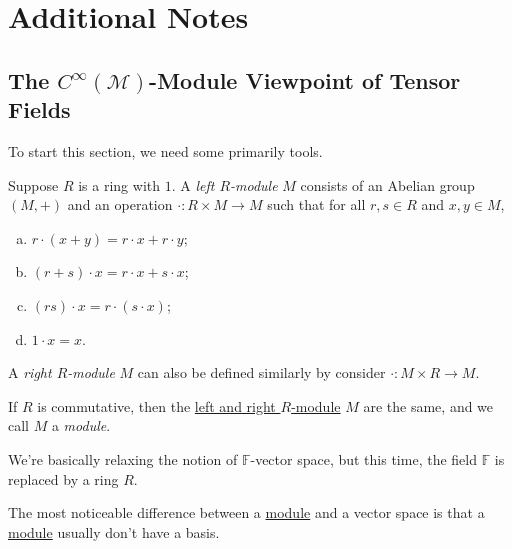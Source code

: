 \chapter{Additional Notes}
\section{The \(C^{\infty} (\mathcal{M} )\)-Module Viewpoint of Tensor Fields}\label{section:C-infty-module-viewpoint-of-tensor-fields}
To start this section, we need some primarily tools.

\begin{definition}\label{def:left-module}
	Suppose \(R\) is a ring with \(1\). A \emph{left \(R\)-module} \(M\) consists of an Abelian group \((M, +)\) and an operation \(\cdot \colon R \times M \to M\) such that for all \(r, s\in R\) and \(x, y\in M\),
	\begin{enumerate}[(a)]
		\item \(r\cdot (x+y) = r\cdot x + r\cdot y\);
		\item \((r+s)\cdot x = r\cdot x + s\cdot x\);
		\item \((rs)\cdot x = r\cdot (s\cdot x)\);
		\item \(1\cdot x = x\).
	\end{enumerate}
\end{definition}

\begin{note}
	A \emph{right \(R\)-module} \(M\) can also be defined similarly by consider \(\cdot \colon M \times R \to M\).
\end{note}

\begin{definition}[Module]\label{def:module}
	If \(R\) is commutative, then the \hyperref[def:left-module]{left and right \(R\)-module} \(M\) are the same, and we call \(M\) a \emph{module}.
\end{definition}

\begin{intuition}
	We're basically relaxing the notion of \(\mathbb{F} \)-vector space, but this time, the field \(\mathbb{F} \) is replaced by a ring \(R\).
\end{intuition}

\begin{remark}
	The most noticeable difference between a \hyperref[def:module]{module} and a vector space is that a \hyperref[def:module]{module} usually don't have a basis.
\end{remark}

